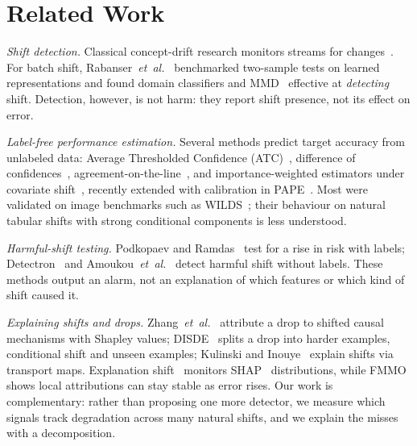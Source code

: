 \documentclass[conference]{IEEEtran}
\theoremstyle{plainhead}
\begin{document}
\section{Related Work}
\textit{Shift detection.} Classical concept-drift research monitors streams for changes~\cite{gama2004ddm,gama2014survey,lu2019learning,webb2016characterizing}. For batch shift, Rabanser~\textit{et~al.}~\cite{rabanser2019failing} benchmarked two-sample tests on learned representations and found domain classifiers and MMD~\cite{gretton2012kernel} effective at \emph{detecting} shift. Detection, however, is not harm: they report shift presence, not its effect on error.

\textit{Label-free performance estimation.} Several methods predict target accuracy from unlabeled data: Average Thresholded Confidence (ATC)~\cite{garg2022atc}, difference of confidences~\cite{guillory2021doc}, agreement-on-the-line~\cite{baek2022agreement,miller2021accuracy}, and importance-weighted estimators under covariate shift~\cite{shimodaira2000improving,sugiyama2007covariate}, recently extended with calibration in PAPE~\cite{bialek2025pape}. Most were validated on image benchmarks such as WILDS~\cite{koh2021wilds}; their behaviour on natural tabular shifts with strong conditional components is less understood.

\textit{Harmful-shift testing.} Podkopaev and Ramdas~\cite{podkopaev2022tracking} test for a rise in risk with labels; Detectron~\cite{ginsberg2023detectron} and Amoukou~\textit{et~al.}~\cite{amoukou2024sequential} detect harmful shift without labels. These methods output an alarm, not an explanation of which features or which kind of shift caused it.

\textit{Explaining shifts and drops.} Zhang~\textit{et~al.}~\cite{zhang2023why} attribute a drop to shifted causal mechanisms with Shapley values; DISDE~\cite{cai2023diagnosing} splits a drop into harder examples, conditional shift and unseen examples; Kulinski and Inouye~\cite{kulinski2023explaining} explain shifts via transport maps. Explanation shift~\cite{mougan2022explanation} monitors SHAP~\cite{lundberg2017unified} distributions, while FMMO~\cite{zafar2026fmmo} shows local attributions can stay stable as error rises. Our work is complementary: rather than proposing one more detector, we measure which signals track degradation across many natural shifts, and we explain the misses with a decomposition.
\end{document}
